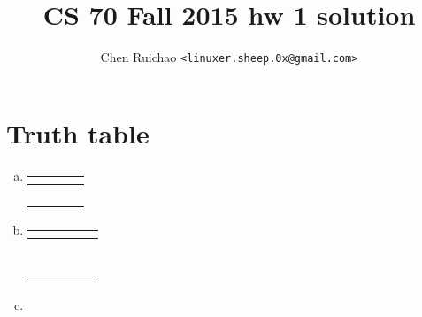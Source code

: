 \documentclass{article}
\begin{document}
\setlength{\parindent}{0px}





\title{CS 70 Fall 2015 hw 1 solution}
\author{Chen Ruichao \texttt{<linuxer.sheep.0x@gmail.com>}}
\date{} %
\maketitle





\section{Truth table}
\begin{enumerate}[(a)]

    \item %

          \begin{tabu}{cc|cc}
              $  $&$  $&$  $&$  $ \\
              \hline
               &  &  &  \\
               &  &  &  \\
               &  &  &  \\
               &  &  &  \\
          \end{tabu}

    \item %

          \begin{tabu}{ccc|cc}
              $  $&$  $&$  $&$  $&$  $ \\
              \hline
                &   &   &   &   \\
                &   &   &   &   \\
                &   &   &   &   \\
                &   &   &   &   \\
                &   &   &   &   \\
                &   &   &   &   \\
                &   &   &   &   \\
                &   &   &   &   \\
          \end{tabu}

    \item %


\end{enumerate}
\end{document}
